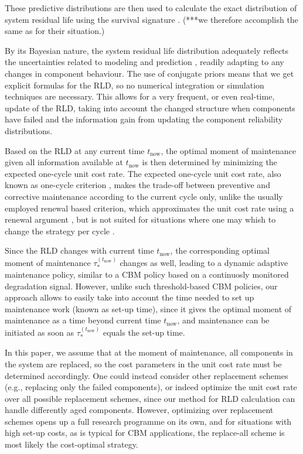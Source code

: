 \documentclass[authoryear]{elsarticle}
\def\tnow{t_\text{now}}
\newcommand{\tausnow}{\tau_*^{(\tnow)}}
\begin{document}
These predictive distributions are then used to calculate the exact distribution of system residual life
using the survival signature \citep{2012:survsign}.
(***we therefore accomplish the same as \cite{2013:si-et-al} for their situation.)

By its Bayesian nature, the system residual life distribution adequately reflects the uncertainties %
related to modeling and prediction \citep{2015:sankararaman},
readily adapting to any changes in component behaviour.
The use of conjugate priors means that we get explicit formulas for the RLD,
so no numerical integration or simulation techniques are necessary.
This allows for a very frequent, or even real-time, update of the RLD,
taking into account the changed structure when components have failed
and the information gain from updating the component reliability distributions.

Based on the RLD at any current time $\tnow$,
the optimal moment of maintenance given all information available at $\tnow$
is then determined by minimizing the expected one-cycle unit cost rate.
The expected one-cycle unit cost rate, also known as one-cycle criterion
\citep{1984:ansell-bendell-humble,1996:mazzuchi-soyer,2006:coolen-schrijner-coolen},
makes the trade-off between preventive and corrective maintenance according to the current cycle only,
unlike the usually employed renewal based criterion,
which approximates the unit cost rate using a renewal argument \citep[p.~296]{1996:mazzuchi-soyer},
but is not suited for situations where one may whish to change the strategy per cycle \citep{2006:coolen-schrijner-coolen}.

Since the RLD changes with current time $\tnow$,
the corresponding optimal moment of maintenance $\tausnow$ changes as well,
leading to a dynamic adaptive maintenance policy,
similar to a CBM policy based on a continuosly monitored degradation signal.
However, unlike such threshold-based CBM policies,
our approach allows to easily take into account the time needed to set up maintenance work (known as set-up time),
since it gives the optimal moment of maintenance as a time beyond current time $\tnow$,
and maintenance can be initiated as soon as $\tausnow$ equals the set-up time.

In this paper, we assume that at the moment of maintenance,
all components in the system are replaced,
so the cost parameters in the unit cost rate must be determined accordingly.
One could instead consider other replacement schemes (e.g., replacing only the failed components),
or indeed optimize the unit cost rate over all possible replacement schemes,
since our method for RLD calculation can handle differently aged components. 
However, optimizing over replacement schemes opens up a full research programme on its own,
and for situations with high set-up costs,
as is typical for CBM applications,
the replace-all scheme is most likely the cost-optimal strategy. 
\end{document}
